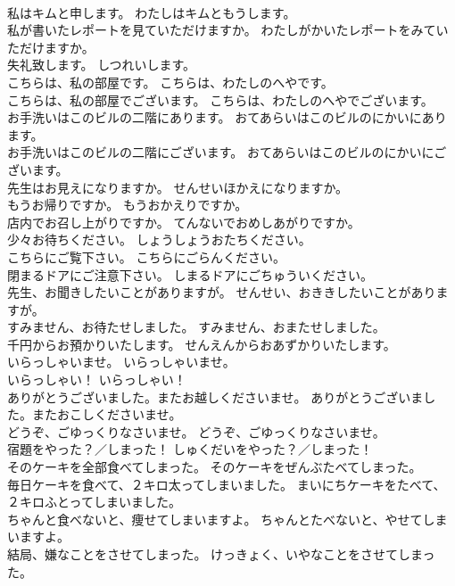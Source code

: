 \documentclass[8pt]{extreport}
\begin{document}
\begin{CJK}{UTF8}{min}
\\	私はキムと申します。	わたしはキムともうします。 
\\	私が書いたレポートを見ていただけますか。	わたしがかいたレポートをみていただけますか。 
\\	失礼致します。	しつれいします。 
\\	こちらは、私の部屋です。	こちらは、わたしのへやです。 
\\	こちらは、私の部屋でございます。	こちらは、わたしのへやでございます。 
\\	お手洗いはこのビルの二階にあります。	おてあらいはこのビルのにかいにあります。 
\\	お手洗いはこのビルの二階にございます。	おてあらいはこのビルのにかいにございます。 
\\	先生はお見えになりますか。	せんせいほかえになりますか。 
\\	もうお帰りですか。	もうおかえりですか。 
\\	店内でお召し上がりですか。	てんないでおめしあがりですか。 
\\	少々お待ちください。	しょうしょうおたちください。 
\\	こちらにご覧下さい。	こちらにごらんください。 
\\	閉まるドアにご注意下さい。	しまるドアにごちゅういください。 
\\	先生、お聞きしたいことがありますが。	せんせい、おききしたいことがありますが。 
\\	すみません、お待たせしました。	すみません、おまたせしました。 
\\	千円からお預かりいたします。	せんえんからおあずかりいたします。 
\\	いらっしゃいませ。	いらっしゃいませ。 
\\	いらっしゃい！	いらっしゃい！ 
\\	ありがとうございました。またお越しくださいませ。	ありがとうございました。またおこしくださいませ。 
\\	どうぞ、ごゆっくりなさいませ。	どうぞ、ごゆっくりなさいませ。 
\\	宿題をやった？／しまった！	しゅくだいをやった？／しまった！ 
\\	そのケーキを全部食べてしまった。	そのケーキをぜんぶたべてしまった。 
\\	毎日ケーキを食べて、２キロ太ってしまいました。	まいにちケーキをたべて、２キロふとってしまいました。 
\\	ちゃんと食べないと、痩せてしまいますよ。	ちゃんとたべないと、やせてしまいますよ。 
\\	結局、嫌なことをさせてしまった。	けっきょく、いやなことをさせてしまった。 

\end{CJK}
\end{document}
